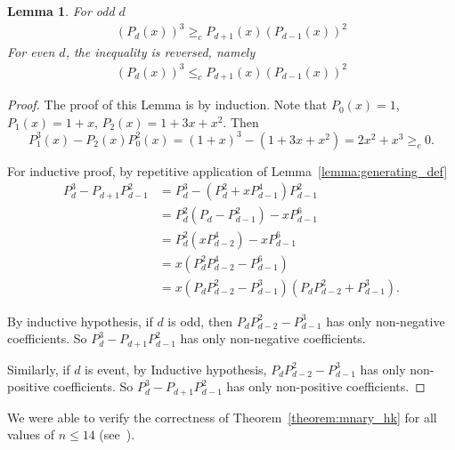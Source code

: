 \documentclass{amsart}
\newtheorem{lemma}[theorem]{Lemma}
\theoremstyle{definition}
\begin{document}
\begin{lemma} 
For odd $d$
\begin{align*}
(P_{d }(x))^3 \geq_{c}  P_{d +1}(x)(P_{d -1}(x))^2
\end{align*}
For even $d$, the inequality is reversed, namely
\begin{align*}
(P_{d}(x))^3 \leq_{c}  P_{d +1}(x)(P_{d - 1}(x))^2
\end{align*}
\end{lemma}
\begin{proof}
The proof of this Lemma is by induction. Note that $P_{0}(x)=1$, $P_{1}(x)=1+x$, $P_2(x)=1+3x+x^2$. Then $$P_{1}^3(x)-P_{2}(x)P_{0}^2(x)=(1+x)^3-(1+3x+x^2)=2x^2+x^3\geq_{c}0.$$

For inductive proof, by repetitive application of Lemma~\ref{lemma:generating_def}
\begin{align*}
P_{d}^{3}-P_{d+1}P_{d-1}^2&=P_{d}^{3}-(P_{d}^2+xP_{d-1}^4)P_{d-1}^2\\
& =P_{d}^2(P_{d}-P_{d-1}^2)-xP_{d-1}^6\\
& = P_{d}^2(xP_{d-2}^4)-xP_{d-1}^{6}\\
&= x(P_{d}^2 P_{d-2}^4 - P_{d-1}^6)\\
&= x(P_{d} P_{d-2}^2 - P_{d-1}^3)(P_{d} P_{d-2}^2 + P_{d-1}^3).
\end{align*}

By inductive hypothesis, if $d$ is odd, then $P_{d} P_{d-2}^2 - P_{d-1}^3$ has only non-negative coefficients. So $P_{d}^{3}-P_{d+1}P_{d-1}^2$ has only non-negative coefficients.

Similarly, if $d$ is event, by Inductive hypothesis, $P_{d} P_{d-2}^2 - P_{d-1}^3$ has only non-positive coefficients. So $P_{d}^{3}-P_{d+1}P_{d-1}^2$ has only non-positive coefficients.

\end{proof}

We were able to verify the correctness of Theorem~\ref{theorem:mnary_hk} for all values of $n\leq 14$ (see~\cite{Atishaya:Github}).

\newpage
\end{document}
